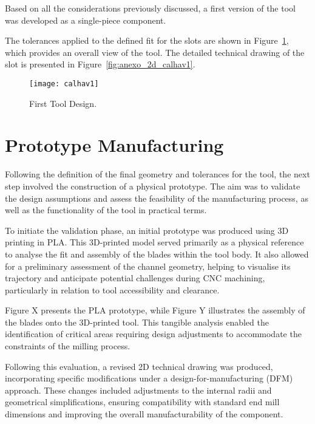 Based on all the considerations previously discussed, a first version of the tool was developed as a single-piece component.

The tolerances applied to the defined fit for the slots are shown in Figure~\ref{fig:calhav1}, which provides an overall view of the tool. The detailed technical drawing of the slot is presented in Figure~\ref{fig:anexo_2d_calhav1}.

\begin{figure}[H]
\centering
\texttt{[image: calhav1]}
\caption{First Tool Design.}
\label{fig:calhav1}
\end{figure}


\section{Prototype Manufacturing}

Following the definition of the final geometry and tolerances for the tool, the next step involved the construction of a physical prototype. 
The aim was to validate the design assumptions and assess the feasibility of the manufacturing process, as well as the functionality of the tool in practical terms.

To initiate the validation phase, an initial prototype was produced using 3D printing in PLA. This 3D-printed model served primarily as a physical reference to analyse the fit and assembly of the blades within the tool body. It also allowed for a preliminary assessment of the channel geometry, helping to visualise its trajectory and anticipate potential challenges during CNC machining, particularly in relation to tool accessibility and clearance.

Figure X presents the PLA prototype, while Figure Y illustrates the assembly of the blades onto the 3D-printed tool. 
This tangible analysis enabled the identification of critical areas requiring design adjustments to accommodate the constraints of the milling process.

Following this evaluation, a revised 2D technical drawing was produced, incorporating specific modifications under a design-for-manufacturing (DFM) approach. 
These changes included adjustments to the internal radii and geometrical simplifications, ensuring compatibility with standard end mill dimensions and improving the overall manufacturability of the component.









